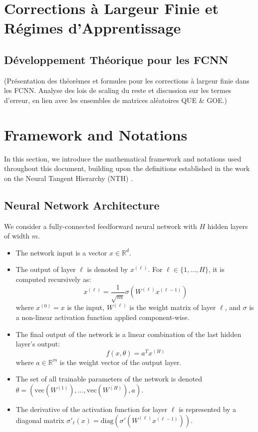 \documentclass[a4paper]{article}
\begin{document}
\section{Corrections à Largeur Finie et Régimes d'Apprentissage}

\subsection{Développement Théorique pour les FCNN}
(Présentation des théorèmes et formules pour les corrections à largeur finie dans les FCNN. Analyse des lois de scaling du reste et discussion sur les termes d'erreur, en lien avec les ensembles de matrices aléatoires QUE & GOE.)



\section{Framework and Notations}

In this section, we introduce the mathematical framework and notations used throughout this document, building upon the definitions established in the work on the Neural Tangent Hierarchy (NTH) \cite{dyer2019asymptoticswidenetworksfeynman}.

\subsection{Neural Network Architecture}

We consider a fully-connected feedforward neural network with $H$ hidden layers of width $m$.
\begin{itemize}
    \item The network input is a vector $x \in \mathbb{R}^d$.
    \item The output of layer $\ell$ is denoted by $x^{(\ell)}$. For $\ell \in \{1, \dots, H\}$, it is computed recursively as:
    \begin{equation}
        x^{(\ell)} = \frac{1}{\sqrt{m}}\sigma(W^{(\ell)}x^{(\ell-1)})
    \end{equation}
    where $x^{(0)} = x$ is the input, $W^{(\ell)}$ is the weight matrix of layer $\ell$, and $\sigma$ is a non-linear activation function applied component-wise.
    \item The final output of the network is a linear combination of the last hidden layer's output:
    \begin{equation}
        f(x, \theta) = a^T x^{(H)}
    \end{equation}
    where $a \in \mathbb{R}^m$ is the weight vector of the output layer.
    \item The set of all trainable parameters of the network is denoted $\theta = (\text{vec}(W^{(1)}), \dots, \text{vec}(W^{(H)}), a)$.
    \item The derivative of the activation function for layer $\ell$ is represented by a diagonal matrix $\sigma'_\ell(x) = \text{diag}(\sigma'(W^{(\ell)}x^{(\ell-1)}))$.
\end{itemize}
\end{document}
